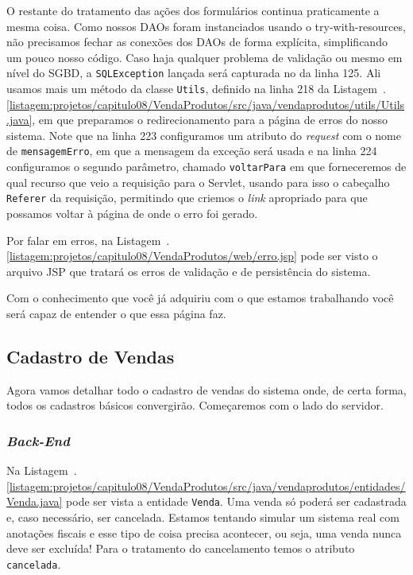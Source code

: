O restante do tratamento das ações dos formulários continua praticamente a mesma coisa. Como nossos DAOs foram instanciados usando o try-with-resources, não precisamos fechar as conexões dos DAOs de forma explícita, simplificando um pouco nosso código. Caso haja qualquer problema de validação ou mesmo em nível do SGBD, a \texttt{SQLException} lançada será capturada no  da linha 125. Ali usamos mais um método da classe \texttt{Utils}, definido na linha 218 da Listagem~\thechapter.\ref{listagem:projetos/capitulo08/VendaProdutos/src/java/vendaprodutos/utils/Utils.java}, em que preparamos o redirecionamento para a página de erros do nosso sistema. Note que na linha 223 configuramos um atributo do \textit{request} com o nome de \texttt{mensagemErro}, em que a mensagem da exceção será usada e na linha 224 configuramos o segundo parâmetro, chamado \texttt{voltarPara} em que forneceremos de qual recurso que veio a requisição para o Servlet, usando para isso o cabeçalho \texttt{Referer} da requisição, permitindo que criemos o \textit{link} apropriado para que possamos voltar à página de onde o erro foi gerado.

Por falar em erros, na Listagem~\thechapter.\ref{listagem:projetos/capitulo08/VendaProdutos/web/erro.jsp} pode ser visto o arquivo JSP que tratará os erros de validação e de persistência do sistema.


Com o conhecimento que você já adquiriu com o que estamos trabalhando você será capaz de entender o que essa página faz.


\subsection{Cadastro de Vendas}

Agora vamos detalhar todo o cadastro de vendas do sistema onde, de certa forma, todos os cadastros básicos convergirão. Começaremos com o lado do servidor.

\subsubsection{\textit{Back-End}}

Na Listagem~\thechapter.\ref{listagem:projetos/capitulo08/VendaProdutos/src/java/vendaprodutos/entidades/Venda.java} pode ser vista a entidade \texttt{Venda}. Uma venda só poderá ser cadastrada e, caso necessário, ser cancelada. Estamos tentando simular um sistema real com anotações fiscais e esse tipo de coisa precisa acontecer, ou seja, uma venda nunca deve ser excluída! Para o tratamento do cancelamento temos o atributo \texttt{cancelada}.

